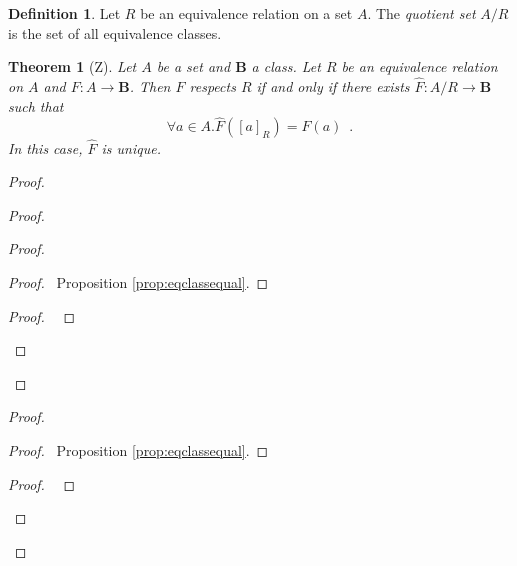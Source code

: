 \documentclass{book}
\let\qed\relax
\newtheorem{thm}[ax]{Theorem}
\theoremstyle{definition}
\newtheorem{df}[ax]{Definition}
\newcommand{\dom}{\ensuremath{\operatorname{dom}}}
\newcommand{\ran}{\ensuremath{\operatorname{ran}}}
\begin{document}
\begin{df}
Let $R$ be an equivalence relation on a set $A$. The \emph{quotient set} $A / R$ is the set of all equivalence classes.
\end{df}

\begin{thm}[Z]
Let $A$ be a set and $\mathbf{B}$ a class. Let $R$ be an equivalence relation on $A$ and $F : A \rightarrow \mathbf{B}$. Then $F$ respects $R$ if and only if there exists $\hat{F} : A/R \rightarrow \mathbf{B}$ such that
\[ \forall a \in A. \hat{F}([a]_R) = F(a) \enspace . \]
In this case, $\hat{F}$ is unique.
\end{thm}

\begin{proof}
\pf
{}
\begin{proof}
	\begin{proof}
		\begin{proof}
			\pf\ Proposition \ref{prop:eqclassequal}.
		\end{proof}
		\begin{proof}
			\pf\ 
		\end{proof}
	\end{proof}
	\step{d}{$\dom \hat{F} = A / R$}
	\step{e}{$\ran \hat{F} \subseteq \mathbf{B}$}
\end{proof}
\begin{proof}
		\begin{proof}
			\pf\ Proposition \ref{prop:eqclassequal}.
		\end{proof}
	\begin{proof}
		\pf\ 
	\end{proof}
\end{proof}
\qed
\end{proof}
\end{document}
